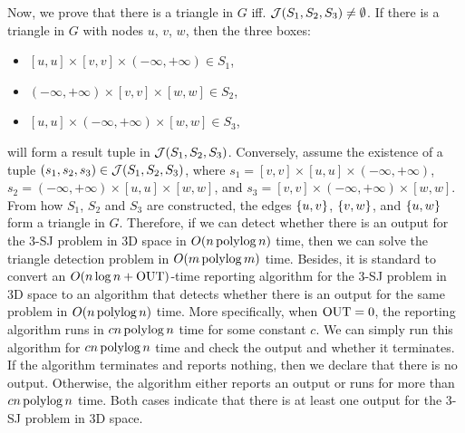 Now, we prove that there is a triangle in $G$ iff.
 $\mathcal{J}(S_1,S_2,S_3) \neq \emptyset$. If there is a triangle in $G$ with nodes $u$, $v$, $w$, then the three boxes:
\begin{itemize}
    \item $[u,u]\times [v,v]\times(-\infty,+\infty)\in S_1$,
    \item $(-\infty,+\infty)\times[v,v]\times [w,w] \in S_2$,
    \item $[u,u]\times(-\infty,+\infty)\times [w,w] \in S_3$,
\end{itemize}
will form a result tuple in $\mathcal{J}(S_1,S_2,S_3)$. Conversely, assume the existence of a tuple $(s_1,s_2,s_3)\in \mathcal{J}(S_1,S_2,S_3)$, where $s_1 = [v,v]\times [u,u]\times(-\infty,+\infty)$, $s_2 = (-\infty,+\infty)\times[u,u]\times [w,w]$, and $s_3 = [v,v]\times(-\infty,+\infty)\times [w,w]$. From how $S_1$, $S_2$ and $S_3$ are constructed, the edges $\{u,v\}$, $\{v,w\}$, and $\{u,w\}$ form a triangle in $G$. Therefore, if we can detect whether there is an output for the 3-SJ problem in 3D space in $O(n\operatorname*{polylog} n)$ time, then we can solve the triangle detection problem 
in $O(m \operatorname*{polylog} m)$ time. Besides, it is standard to convert an $O(n \log n + \mathrm{OUT})$-time reporting algorithm for the 3-SJ problem in 3D space to an algorithm that detects whether there is an output for the same problem in $O(n \operatorname*{polylog} n)$ time. More specifically, when $\mathrm{OUT} = 0$, the reporting algorithm runs in $cn\operatorname*{polylog} n$ time for some constant $c$. We can simply run this algorithm for $cn\operatorname*{polylog} n$ time and check the output and whether it terminates. If the algorithm terminates and reports nothing, then we declare that there is no output. Otherwise, the algorithm either reports an output or runs for more than $cn\operatorname*{polylog} n$ time. Both cases indicate that there is at least one output for the 3-SJ problem in 3D space. 
